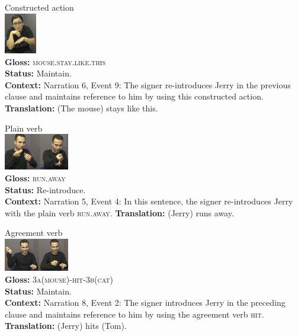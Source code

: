 \documentclass[review]{elsarticle} %
\begin{document}
\begin{exe}
\ex
\begin{xlist}
\ex \label{ex:5a} Constructed action \\\glll
{} \includegraphics[width=40pt]{pictures/p10.png} \\ \textbf{Gloss:} \textsc{mouse.stay.like.this} \\ 
\textbf{Status:} Maintain. \\
\glt \textbf{Context:} Narration 6, Event 9: The signer re-introduces Jerry in the previous clause and maintains reference to him by using this constructed action.
\glt \textbf{Translation:} (The mouse) stays like this.
\vspace{0.35cm}

\ex \label{ex:5b} Plain verb \\\glll
{} \includegraphics[width=80pt]{pictures/p11.png} \\ \textbf{Gloss:} \textsc{run.away} \\ 
\textbf{Status:} Re-introduce. \\
\glt \textbf{Context:} Narration 5, Event 4: In this sentence, the signer re-introduces Jerry with the plain verb \textsc{run.away}.
\glt \textbf{Translation:} (Jerry) runs away.
\vspace{0.35cm}

\ex \label{ex:5c} Agreement verb \\\glll
{} \includegraphics[width=80pt]{pictures/p12.png} \\ \textbf{Gloss:} \textsc{3a(mouse)-hit-3b(cat)} \\ 
\textbf{Status:} Maintain. \\
\glt \textbf{Context:} Narration 8, Event 2: The signer introduces Jerry in the preceding clause and maintains reference to him by using the agreement verb \textsc{hit}.
\glt \textbf{Translation:} (Jerry) hits (Tom).
\vspace{0.35cm}

\end{xlist}
\end{exe}
\end{document}
